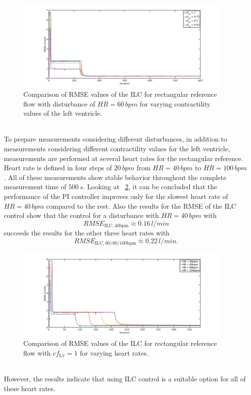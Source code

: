 \begin{figure}[ht!]
  \centering
  \includegraphics[width=0.95\textwidth]{images/chapt_5/ILC/RMSE_dist_square_60_var_cf.pdf}
  \caption[RMSE Comparison of ILC for a rectangular reference flow for varying left ventricular contractilities]{Comparison of RMSE values of the ILC for rectangular reference flow with disturbance of $HR=60\,bpm$ for varying contractility values of the left ventricle.}
  \label{fig:RMSE_dist_square_60_var_cf}
\end{figure}
\\To prepare measurements considering different disturbances, in addition to measurements considering different contractility values for the left ventricle, measurements are performed at several heart rates for the rectangular reference. Heart rate is defined in four steps of $20\,bpm$ from $HR=40\,bpm$ to $HR=100\,bpm$. All of these measurements show stable behavior throughout the complete measurement time of $500\,s$.
Looking at \figurename~\ref{fig:RMSE_dist_square_const_var_hr}, it can be concluded that the performance of the PI controller improves only for the slowest heart rate of $HR=40\,bpm$ compared to the rest. Also the results for the RMSE of the ILC control show that the control for a disturbance with $HR=40\,bpm$ with
\begin{equation}
  RMSE_{\mathrm{ILC,40bpm}}\approx 0.16\,l/min
\end{equation}
succeeds the results for the other three heart rates with
\begin{equation}
  RMSE_{\mathrm{ILC,60/80/100bpm}}\approx 0.22\,l/min.
\end{equation}
\begin{figure}[ht!]
  \centering
  \includegraphics[width=0.95\textwidth]{images/chapt_5/ILC/RMSE_dist_square_const_var_hr.pdf}
  \caption[RMSE Comparison of ILC at rectangular reference flow for varying heart rates]{Comparison of RMSE values of the ILC for rectangular reference flow with $cf_{\mathrm{Lv}}=1$ for varying heart rates.}
  \label{fig:RMSE_dist_square_const_var_hr}
\end{figure}
\\However, the results indicate that using ILC control is a suitable option for all of these heart rates.
